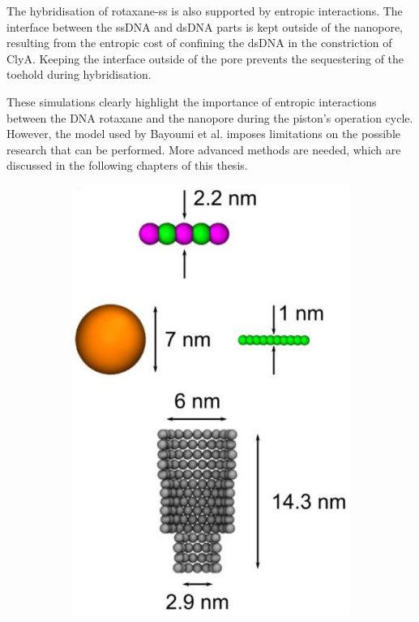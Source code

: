 The hybridisation of rotaxane-ss is also supported by entropic interactions. The
interface between the ssDNA and dsDNA parts is kept outside of the nanopore, resulting
from the entropic cost of confining the dsDNA in the constriction of ClyA. Keeping the
interface outside of the pore prevents the sequestering of the toehold during
hybridisation.

These simulations clearly highlight the importance of entropic interactions between the
DNA rotaxane and the nanopore during the piston's operation cycle. However, the model
used by Bayoumi et al.\cite{Bayoumi21} imposes limitations on the possible research that
can be
performed. More advanced methods are needed, which are discussed in the following
chapters of this thesis.\\

\begin{figure}[ht]
  \begin{centering}
  \begin{subfigure}[t]{\dimexpr.41\linewidth-1.3em\relax}
  \centering
  \includegraphics[width=0.9\linewidth,valign=t]{Figures/Stefanos1.png}

\end{subfigure}
\end{centering}
\end{figure}
